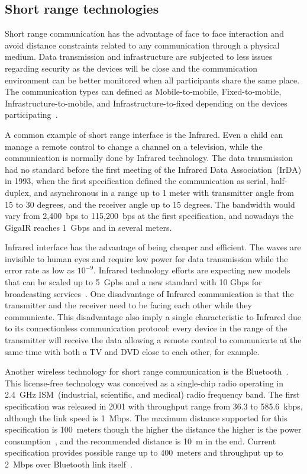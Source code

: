 \subsection*{Short range technologies} 

Short range communication has the advantage of face to face interaction and avoid distance constraints related to any communication through a physical medium.
Data transmission and infrastructure are subjected to less issues regarding security as the devices will be close and the communication environment can be better monitored when all participants share the same place.
The communication types can defined as Mobile-to-mobile, Fixed-to-mobile, Infrastructure-to-mobile, and Infrastructure-to-fixed depending on the devices participating~\citep{Deicke201optical}.

A common example of short range interface is the Infrared.
Even a child can manage a remote control to change a channel on a television, while the communication is normally done by Infrared technology.
The data transmission had no standard before the first meeting of the Infrared Data Association~(IrDA) in 1993, when the first specification defined the communication as serial, half-duplex, and asynchronous in a range up to 1 meter with transmitter angle from 15 to 30 degrees, and the receiver angle up to 15 degrees.
The bandwidth would vary from 2,400~bps to 115,200~bps at the first specification, and nowadays the GigaIR reaches 1~Gbps and in several meters.

Infrared interface has the advantage of being cheaper and efficient.
The waves are invisible to human eyes and require low power for data transmission while the error rate as low as $10^{-9}$.
Infrared technology efforts are expecting new models that can be scaled up to 5~Gpbs and a new standard with 10 Gbps for broadcasting services~\citep{Deicke201optical}.
One disadvantage of Infrared communication is that the transmitter and the receiver need to be facing each other while they communicate.
This disadvantage also imply a single characteristic to Infrared due to its connectionless communication protocol: every device in the range of the transmitter will receive the data allowing a remote control to communicate at the same time with both a TV and DVD close to each other, for example.

Another wireless technology for short range communication is the Bluetooth~\citep{Bhagwat2001bluetooth}.
This license-free technology was conceived as a single-chip radio operating in 2.4~GHz ISM~(industrial, scientific, and medical) radio frequency band.
The first specification was released in 2001 with throughput range from 36.3 to 585.6~kbps, although the link speed is 1~Mbps.
The maximum distance supported for this specification is 100~meters though the higher the distance the higher is the power consumption~\citep[p.~20]{Gupta2013insidebluetooth}, and the recommended distance is 10~m in the end.
Current specification provides possible range up to 400~meters and throughput up to 2~Mbps over Bluetooth link itself~\citep{Bluetooth2016bluetooth}.

